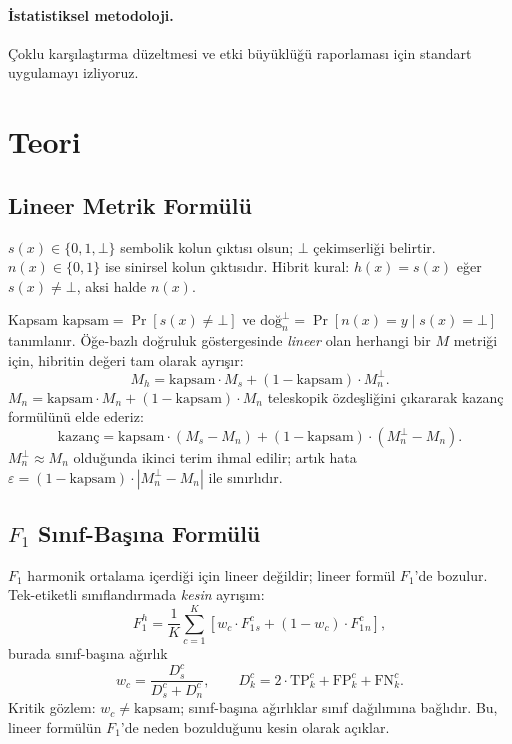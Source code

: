 \documentclass[11pt,a4paper]{article}
\begin{document}
\paragraph{İstatistiksel metodoloji.}
Çoklu karşılaştırma düzeltmesi \cite{benjamini1995controlling} ve
etki büyüklüğü raporlaması \cite{cohen1988statistical} için standart
uygulamayı izliyoruz.

\section{Teori}
\label{sec:theory}

\subsection{Lineer Metrik Formülü}
\label{sec:linear}

$s(x) \in \{0, 1, \bot\}$ sembolik kolun çıktısı olsun; $\bot$ çekimserliği
belirtir. $n(x) \in \{0, 1\}$ ise sinirsel kolun çıktısıdır. Hibrit kural:
$h(x) = s(x)$ eğer $s(x) \neq \bot$, aksi halde $n(x)$.

Kapsam $\text{kapsam} = \Pr[s(x) \neq \bot]$ ve
$\text{doğ}_n^\bot = \Pr[n(x) = y \mid s(x) = \bot]$ tanımlanır.
Öğe-bazlı doğruluk göstergesinde \emph{lineer} olan herhangi bir $M$
metriği için, hibritin değeri tam olarak ayrışır:
\begin{equation}
M_h = \text{kapsam} \cdot M_s + (1 - \text{kapsam}) \cdot M_n^\bot.
\label{eq:linear-exact}
\end{equation}
$M_n = \text{kapsam} \cdot M_n + (1 - \text{kapsam}) \cdot M_n$
teleskopik özdeşliğini çıkararak kazanç formülünü elde ederiz:
\begin{equation}
\text{kazanç} = \text{kapsam} \cdot (M_s - M_n) + (1-\text{kapsam}) \cdot (M_n^\bot - M_n).
\label{eq:linear-gain}
\end{equation}
$M_n^\bot \approx M_n$ olduğunda ikinci terim ihmal edilir; artık hata
$\varepsilon = (1-\text{kapsam}) \cdot |M_n^\bot - M_n|$ ile sınırlıdır.

\subsection{$F_1$ Sınıf-Başına Formülü}
\label{sec:f1}

$F_1$ harmonik ortalama içerdiği için lineer değildir; lineer formül
$F_1$'de bozulur. Tek-etiketli sınıflandırmada \emph{kesin} ayrışım:
\begin{equation}
F_1^h = \frac{1}{K} \sum_{c=1}^{K}
\left[ w_c \cdot F_1^c_s + (1-w_c) \cdot F_1^c_n \right],
\label{eq:f1}
\end{equation}
burada sınıf-başına ağırlık
\begin{equation}
w_c = \frac{D_s^c}{D_s^c + D_n^c}, \qquad
D_k^c = 2 \cdot \text{TP}_k^c + \text{FP}_k^c + \text{FN}_k^c.
\label{eq:f1-weight}
\end{equation}
Kritik gözlem: $w_c \neq \text{kapsam}$; sınıf-başına ağırlıklar
sınıf dağılımına bağlıdır. Bu, lineer formülün $F_1$'de neden
bozulduğunu kesin olarak açıklar.
\end{document}
